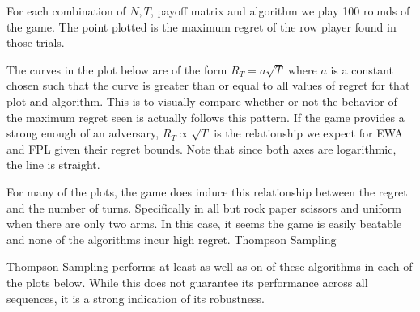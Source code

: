 \documentclass[10pt,a4paper]{article} %
\begin{document}
	For each combination of $N, T$, payoff matrix and algorithm we play 100 rounds of the game.  The point plotted is the maximum regret of the row player found in those trials.
	
	\pagebreak

	The curves in the plot below are of the form $R_T = a \sqrt{T}$ where $a$ is a constant chosen such that the curve is greater than or equal to all values of regret for that plot and algorithm.  This is to visually compare whether or not the behavior of the maximum regret seen is actually follows this pattern. If the game provides a strong enough of an adversary, $R_T \propto \sqrt{T}$ is the relationship we expect for EWA and FPL given their regret bounds.  Note that since both axes are logarithmic, the line is straight. 
	
	For many of the plots, the game does induce this relationship between the regret and the number of turns.  Specifically in all but rock paper scissors and uniform when there are only two arms.  In this case, it seems the game is easily beatable and none of the algorithms incur high regret.  Thompson Sampling 
	
	Thompson Sampling performs at least as well as on of these algorithms in each of the plots below.  While this does not guarantee its performance across all sequences, it is a strong indication of its robustness.

	\begin{figure}[h!]
	\end{figure}
\end{document}
